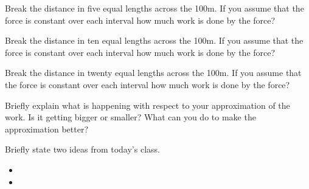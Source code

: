 \begin{problem}
  \begin{subproblem}
  \item Break the distance in five equal lengths across the 100m.  If
    you assume that the force is constant over each interval how much
    work is done by the force?

    \vfill

  \item Break the distance in ten equal lengths across the 100m.  If
    you assume that the force is constant over each interval how much
    work is done by the force?

    \vfill

    \clearpage

  \item Break the distance in twenty equal lengths across the 100m.  If
    you assume that the force is constant over each interval how much
    work is done by the force?

    \vfill

  \item Briefly explain what is happening with respect to your
    approximation of the work. Is it getting bigger or smaller? What
    can you do to make the approximation better?

    \vspace{3em}

  \end{subproblem}
\end{problem}

\postClass

\begin{problem}
\item Briefly state two ideas from today's class.
  \begin{itemize}
  \item
  \item
  \end{itemize}
\item
  \begin{subproblem}
    \item
  \end{subproblem}
\end{problem}




